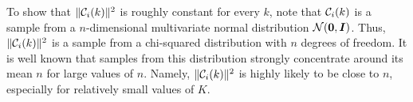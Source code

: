 To show that $\lVert{\mathcal{C}}_{i}(k)\rVert^{2}$ is roughly constant for every $k$, note that ${\mathcal{C}}_{i}(k)$ is a sample from a $n$-dimensional multivariate normal distribution $\mathcal{N}({\bm{0}},{\bm{I}})$.
Thus, $\lVert{\mathcal{C}}_{i}(k)\rVert^{2}$ is a sample from a chi-squared distribution with $n$ degrees of freedom.
It is well known that samples from this distribution strongly concentrate around its mean $n$ for large values of $n$.
Namely, $\lVert{\mathcal{C}}_{i}(k)\rVert^{2}$ is highly likely to be close to $n$, especially for relatively small values of $K$.